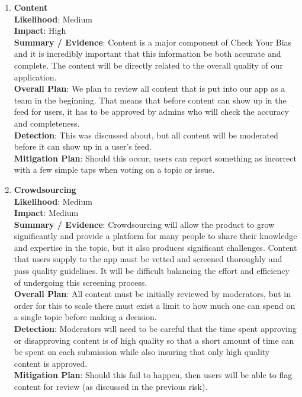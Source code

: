 \documentclass[11pt]{article}
\begin{document}
\begin{enumerate}[nolistsep]
    \item \textbf{Content}\\
        \textbf{Likelihood}: Medium\\
        \textbf{Impact}: High\\
        \textbf{Summary / Evidence}: Content is a major component of Check Your Bias and it is incredibly important that this information be both accurate and complete. The content will be directly related to the overall quality of our application.\\
        \textbf{Overall Plan}: We plan to review all content that is put into our app as a team in the beginning. That means that before content can show up in the feed for users, it has to be approved by admins who will check the accuracy and completeness.\\
        \textbf{Detection}: This was discussed about, but all content will be moderated before it can show up in a user's feed.\\
        \textbf{Mitigation Plan}: Should this occur, users can report something as incorrect with a few simple taps when voting on a topic or issue.\\[-10pt]

    \item \textbf{Crowdsourcing}\\
        \textbf{Likelihood}: Medium\\
        \textbf{Impact}: Medium\\
        \textbf{Summary / Evidence}: Crowdsourcing will allow the product to grow significantly and provide a platform for many people to share their knowledge and expertise in the topic, but it also produces significant challenges. Content that users supply to the app must be vetted and screened thoroughly and pass quality guidelines. It will be difficult balancing the effort and efficiency of undergoing this screening process.\\
        \textbf{Overall Plan}: All content must be initially reviewed by moderators, but in order for this to scale there must exist a limit to how much one can spend on a single topic before making a decision. \\
        \textbf{Detection}: Moderators will need to be careful that the time spent approving or disapproving content is of high quality so that a short amount of time can be spent on each submission while also insuring that only high quality content is approved.\\
        \textbf{Mitigation Plan}: Should this fail to happen, then users will be able to flag content for review (as discussed in the previous risk).\\[-10pt]


\end{enumerate}
\end{document}
